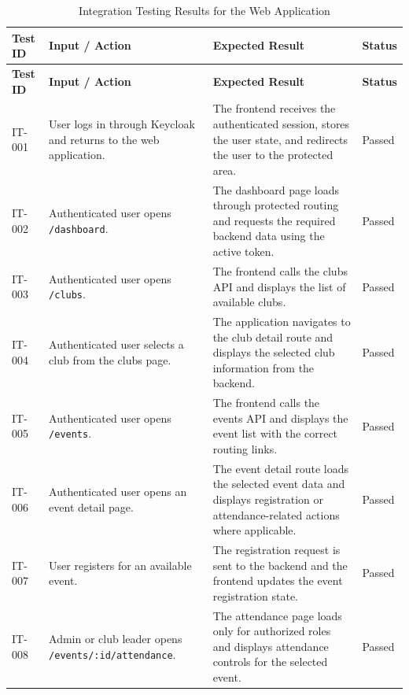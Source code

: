 
\begin{longtable}{|p{}|p{}|p{}|p{}|}
\caption{Integration Testing Results for the Web Application}
\label{tab:web-app-integration-testing}\\
\hline
\textbf{Test ID} & \textbf{Input / Action} & \textbf{Expected Result} & \textbf{Status} \\
\hline
\endfirsthead

\hline
\textbf{Test ID} & \textbf{Input / Action} & \textbf{Expected Result} & \textbf{Status} \\
\hline
\endhead

IT-001 & User logs in through Keycloak and returns to the web application. & The frontend receives the authenticated session, stores the user state, and redirects the user to the protected area. & Passed \\
\hline
IT-002 & Authenticated user opens \texttt{/dashboard}. & The dashboard page loads through protected routing and requests the required backend data using the active token. & Passed \\
\hline
IT-003 & Authenticated user opens \texttt{/clubs}. & The frontend calls the clubs API and displays the list of available clubs. & Passed \\
\hline
IT-004 & Authenticated user selects a club from the clubs page. & The application navigates to the club detail route and displays the selected club information from the backend. & Passed \\
\hline
IT-005 & Authenticated user opens \texttt{/events}. & The frontend calls the events API and displays the event list with the correct routing links. & Passed \\
\hline
IT-006 & Authenticated user opens an event detail page. & The event detail route loads the selected event data and displays registration or attendance-related actions where applicable. & Passed \\
\hline
IT-007 & User registers for an available event. & The registration request is sent to the backend and the frontend updates the event registration state. & Passed \\
\hline
IT-008 & Admin or club leader opens \texttt{/events/:id/attendance}. & The attendance page loads only for authorized roles and displays attendance controls for the selected event. & Passed \\

\end{longtable}
